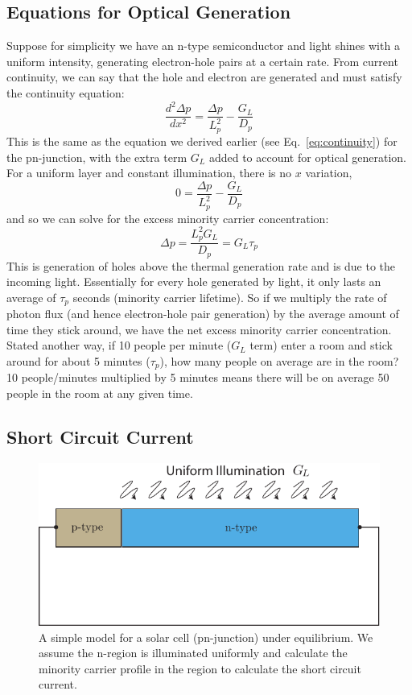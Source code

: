 \subsection{Equations for Optical Generation}
Suppose for simplicity we have an n-type semiconductor and light shines with a uniform intensity, generating electron-hole pairs at a certain rate.   From current continuity, we can say that the hole and electron are generated and must satisfy the continuity equation:
\begin{equation} 
	\frac{d^2 \Delta p}{dx^2}   = \frac{\Delta p}{L_p^2} - \frac{G_L}{D_p}
\end{equation}
This is the same as the equation we derived earlier (see Eq.~\ref{eq:continuity}) for the pn-junction, with the extra term $G_L$ added to account for optical generation.   For a uniform layer and constant illumination, there is no $x$ variation, 
\begin{equation} 
	0   = \frac{\Delta p}{L_p^2} - \frac{G_L}{D_p}
\end{equation}
and so we can solve for the excess minority carrier concentration:
\begin{equation} 
	\Delta p = \frac{L_p^2 G_L}{D_p} = G_L \tau_p
\end{equation}
This is generation of holes above the thermal generation rate and is due to the incoming light.  Essentially for every hole generated by light, it only lasts an average of $\tau_p$ seconds (minority carrier lifetime).  So if we multiply the rate of photon flux (and hence electron-hole pair generation) by the average amount of time they stick around, we have the net excess minority carrier concentration.   Stated another way, if 10 people per minute ($G_L$ term) enter a room and stick around for about 5 minutes ($\tau_p$), how many people on average are in the room?   10 people/minutes multiplied by 5 minutes means there will be on average 50 people in the room at any given time.  
\subsection{Short Circuit Current}
\begin{figure}[tb]
\begin{center}
\includegraphics[width=.5\columnwidth]{pn_solar_cell}
\end{center}
\caption{A simple model for a solar cell (pn-junction) under equilibrium.  We assume the n-region is illuminated uniformly and calculate the minority carrier profile in the region to calculate the short circuit current.}
\label{fig:pn_solar_cell}
\end{figure}


